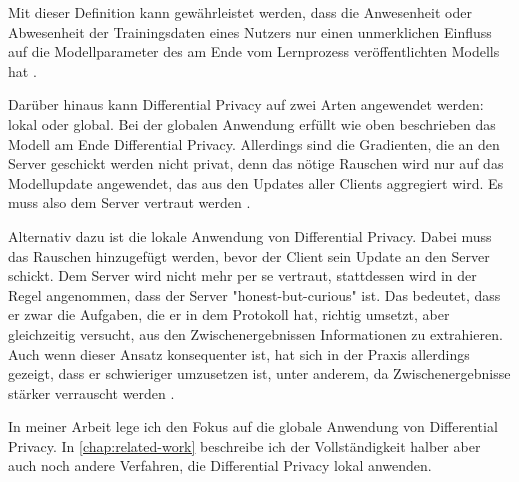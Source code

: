 Mit dieser Definition kann gewährleistet werden, dass die Anwesenheit oder Abwesenheit der Trainingsdaten eines Nutzers nur einen unmerklichen Einfluss auf die Modellparameter des am Ende vom Lernprozess veröffentlichten Modells hat \cite{mcmahan:2018}.

Darüber hinaus kann Differential Privacy auf zwei Arten angewendet werden: lokal oder global. Bei der globalen Anwendung erfüllt wie oben beschrieben das Modell am Ende Differential Privacy. Allerdings sind die Gradienten, die an den Server geschickt werden nicht privat, denn das nötige Rauschen wird nur auf das Modellupdate angewendet, das aus den Updates aller Clients aggregiert wird. Es muss also dem Server vertraut werden \cite[p.44]{kairouz:2021}.

Alternativ dazu ist die lokale Anwendung von Differential Privacy. Dabei muss das Rauschen hinzugefügt werden, bevor der Client sein Update an den Server schickt. Dem Server wird nicht mehr per se vertraut, stattdessen wird in der Regel angenommen, dass der Server "honest-but-curious" ist. Das bedeutet, dass er zwar die Aufgaben, die er in dem Protokoll hat, richtig umsetzt, aber gleichzeitig versucht, aus den Zwischenergebnissen Informationen zu extrahieren. Auch wenn dieser Ansatz konsequenter ist, hat sich in der Praxis allerdings gezeigt, dass er schwieriger umzusetzen ist, unter anderem, da Zwischenergebnisse stärker verrauscht werden \cite[p.54]{kairouz:2021}.

In meiner Arbeit lege ich den Fokus auf die globale Anwendung von Differential Privacy. In \autoref{chap:related-work} beschreibe ich der Vollständigkeit halber aber auch noch andere Verfahren, die Differential Privacy lokal anwenden.